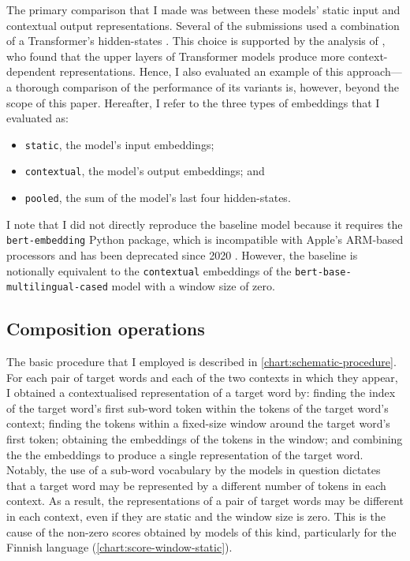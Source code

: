 The primary comparison that I made was between these models' static input and
contextual output representations.
Several of the submissions used a combination of a Transformer's hidden-states
\parencites[e.g.,][276]{Gamallo2020}[3]{Pessutto2020}[4]{Hettiarachchi2021}.
This choice is supported by the analysis of \textcite{Ethayarajh2019}, who found that
the upper layers of Transformer models produce more context-dependent representations.
Hence, I also evaluated an example of this approach—a thorough comparison of the
performance of its variants is, however, beyond the scope of this paper.
Hereafter, I refer to the three types of embeddings that I evaluated as:
\begin{itemize}
  \item \texttt{static}, the model's input embeddings;
  \item \texttt{contextual}, the model's output embeddings; and
  \item \texttt{pooled}, the sum of the model's last four hidden-states.
\end{itemize}

I note that I did not directly reproduce the baseline model because it requires the
\texttt{bert-embedding} Python package, which is incompatible with Apple's ARM-based
processors and has been deprecated since 2020 \parencite{Lai2023}.
However, the baseline is notionally equivalent to the \texttt{contextual} embeddings of
the \texttt{bert-base-multilingual-cased} model with a window size of zero.

\subsection{Composition operations}

The basic procedure that I employed is described in \cref{chart:schematic-procedure}.
For each pair of target words and each of the two contexts in which they appear, I
obtained a contextualised representation of a target word by: finding the index of the
target word's first sub-word token within the tokens of the target word's context;
finding the tokens within a fixed-size window around the target word's first token;
obtaining the embeddings of the tokens in the window; and combining the the embeddings
to produce a single representation of the target word.
Notably, the use of a sub-word vocabulary by the models in question
\parencite[e.g.,][4174]{Devlin2019} dictates that a target word may be represented by a
different number of tokens in each context.
As a result, the representations of a pair of target words may be different in each
context, even if they are static and the window size is zero.
This is the cause of the non-zero scores obtained by models of this kind, particularly
for the Finnish language (\cref{chart:score-window-static}).

